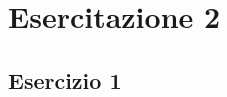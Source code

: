 \documentclass{article}
\begin{document}
	\section{Esercitazione 2}
	\subsection{Esercizio 1}
	
\end{document}
